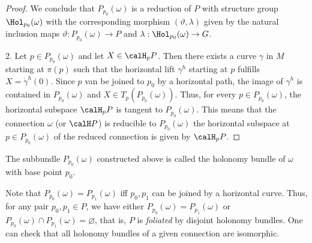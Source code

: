 \begin{proof}
    We conclude that $P_{p_0}(\omega)$ is a reduction of $P$ with structure group $\Hol_{p_0}(\omega)$ with the corresponding morphism $(\vartheta,\lambda)$ given by the natural inclusion maps $\vartheta:P_{p_0}(\omega)\to P$ and $\lambda:\Hol_{p_0}(\omega)\to G$.

    2. Let $p\in P_{p_0}(\omega)$ and let $X\in\calH_p P$. Then there exists a curve $\gamma$ in $M$ starting at $\pi(p)$ such that the horizontal lift $\gamma^h$ starting at $p$ fulfills $X=\dot\gamma^h(0)$. Since $p$ van be joined to $p_0$ by a horizontal path, the image of $\gamma^h$ is contained in $P_{p_0}(\omega)$ and $X\in T_p(P_{p_0}(\omega))$. Thus, for every $p\in P_{p_0}(\omega)$, the horizontal subspace $\calH_p P$ is tangent to $P_{p_0}(\omega)$. This means that the connection $\omega$ (or $\calH P$) is reducible to $P_{p_0}(\omega)$ the horizontal subspace at $p\in P_{p_0}(\omega)$ of the reduced connection is given by $\calH_p P$.
\end{proof}

\begin{defn}
    The subbundle $P_{p_0}(\omega)$ constructed above is called the holonomy bundle of $\omega$ with base point $p_0$.
\end{defn}

Note that $P_{p_0}(\omega)=P_{p_1}(\omega)$ iff $p_0,p_1$ can be joined by a horizontal curve. Thus, for any pair $p_0,p_1\in P$, we have either $P_{p_0}(\omega)=P_{p_1}(\omega)$ or $P_{p_0}(\omega)\cap P_{p_1}(\omega)=\varnothing$, that is, $P$ is \emph{foliated} by disjoint holonomy bundles. One can check that all holonomy bundles of a given connection are isomorphic.

